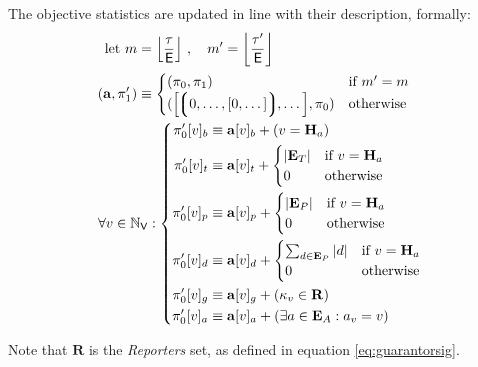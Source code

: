 
The objective statistics are updated in line with their description, formally:
\begin{align}
    \using m =\; &\ffrac{\tau}{\mathsf{E}} \ ,\quad m' = \ffrac{\tau'}{\mathsf{E}}\\
    (\mathbf{a}, \pi'_1) \equiv\;&\begin{cases}
        (\pi_0, \pi_1) &\when m' = m \\
        (\sq{\tuple{0, \dots, [0, \dots]}, \dots}, \pi_0) &\otherwise
    \end{cases}\\
    \forall v \in \N_\mathsf{V} :&\; \left\{\begin{aligned}
        \pi'_0[v]_b &\equiv \mathbf{a}[v]_b + (v = \mathbf{H}_a)\\
        \pi'_0[v]_t &\equiv \mathbf{a}[v]_t + \begin{cases}
            |\mathbf{E}_T| &\when v = \mathbf{H}_a \\
            0 &\otherwise
        \end{cases}\\
        \pi'_0[v]_p &\equiv \mathbf{a}[v]_p + \begin{cases}
            |\mathbf{E}_P| &\when v = \mathbf{H}_a \\
            0 &\otherwise
        \end{cases}\\
        \pi'_0[v]_d &\equiv \mathbf{a}[v]_d + \begin{cases}
            \sum_{d \in \mathbf{E}_P}|d| &\when v = \mathbf{H}_a \\
            0 &\otherwise
        \end{cases}\\
        \pi'_0[v]_g &\equiv \mathbf{a}[v]_g + (\kappa_v \in \mathbf{R})\\
        \pi'_0[v]_a &\equiv \mathbf{a}[v]_a + (\exists a \in \mathbf{E}_A : a_v = v)
    \end{aligned}\right.
\end{align}

Note that $\mathbf{R}$ is the \emph{Reporters} set, as defined in equation \ref{eq:guarantorsig}.